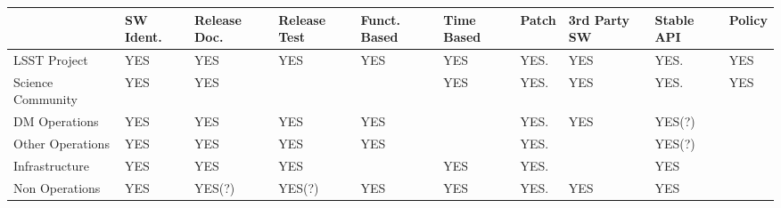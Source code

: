 \setlength\LTleft{-0.4in}
\setlength\LTright{-0.5in}
\begin{longtable}{p{2.4cm}p{1.2cm}p{1.4cm}p{1.4cm}p{1.3cm}p{1.3cm}p{1.3cm}p{1.7cm}p{1.3cm}p{1.3cm}}\hline
&
SW Ident.            & Release Doc.                  & Release Test & Funct. Based           & Time Based & Patch & 3rd Party SW  & Stable API  & Policy \\ \hline
LSST Project &
YES                     & YES                                & YES               &  YES                        &  YES            & YES.   & YES               &  YES.          & YES   \\ \hline
Science Community &
YES                     & YES                                &                       &                                 &  YES            & YES.   & YES               &  YES.          & YES   \\ \hline
DM Operations &
YES                     & YES                                & YES               & YES                         &                     & YES.   & YES               &  YES(?)      &            \\ \hline
Other Operations &
YES                     & YES                                & YES               & YES                         &                     & YES.   &                       &  YES(?)      &            \\ \hline
Infrastructure &
YES                     & YES                                & YES               &                                 &  YES            & YES.   &                       &  YES           &            \\ \hline
Non Operations &
YES                     & YES(?)                            & YES(?)          & YES                         &  YES            & YES.   & YES               &  YES          &            \\ \hline
\hline
\end{longtable}
\setlength\LTleft{0in}
\setlength\LTright{0in}


